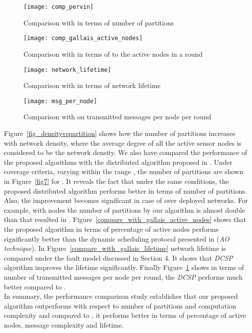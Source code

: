 \documentclass{acm_proc_article-sp}
\begin{document}
\begin{figure}[ht!]
\begin{minipage}[b]{0.425\linewidth}
		  \centering
		   \texttt{[image: comp\_pervin]}
		  \caption{\scriptsize{Comparison with \cite{Pervin} in terms of number of partitions }}
		  \label{fig7}
	      \end{minipage}
	      \hspace{0.8cm}
	      \begin{minipage}[b]{0.45\linewidth}
		  \centering
		  \texttt{[image: comp\_gallais\_active\_nodes]}
		  \caption{\scriptsize{Comparison with \cite{Gallais} in terms of to the active nodes in a round}}
		  \label{compare_with_gallais_active_nodes}
	      \end{minipage}
\begin{minipage}[b]{0.40\linewidth}
		  \centering
		    \texttt{[image: network\_lifetime]} 
		  \caption{\scriptsize{Comparison with \cite{Gallais} in terms of network lifetime }}
		  \label{compare_with_gallais_lifetime}
		\end{minipage}
		      \hspace{0.8cm}
		\begin{minipage}[b]{0.46\linewidth}
		  \centering
		  \texttt{[image: msg\_per\_node]}
		  \caption{\scriptsize{Comparison with \cite{Gallais} on transmitted messages per node per round}}
		  \label{compare_with_gallais_messages}
	      \end{minipage}
		\end{figure}
 Figure~\ref{fig_densityvspartition} shows how the number of partitions increases with network density, where the average degree  of all the active sensor nodes is considered to be the network density.
 We also have compared the performance of the proposed algorithms with the distributed algorithm proposed in \cite{Pervin}. Under  coverage criteria, varying  within the range , the number of partitions are shown in Figure~\ref{fig7} for . It reveals the fact that under the same conditions, the proposed distributed algorithm performs better in terms of number of partitions. Also, the improvement becomes significant in case of over deployed networks. For example, with  nodes the number of partitions by our algorithm is almost double than that resulted in \cite{Pervin}.
Figure~\ref{compare_with_gallais_active_nodes} shows that the proposed algorithm in terms of percentage of active nodes performs significantly better than the dynamic scheduling protocol presented in \cite{Gallais} ({\it AO technique}). In Figure~\ref{compare_with_gallais_lifetime} network lifetime is compared under the fault model discussed in Section 4. It shows that {\it DCSP} algorithm improves the lifetime significantly. Finally  Figure~\ref{compare_with_gallais_messages} shows in terms of number of transmitted messages per node per round, the {\it DCSP} performs much better compared to \cite{Gallais}.
\\In summary, the performance comparison study establishes that our proposed algorithm outperforms \cite{Pervin} with respect to number of partitions and computation complexity and compared to \cite{Gallais}, it performs better in terms of percentage of active nodes, message complexity and lifetime.
\end{document}
